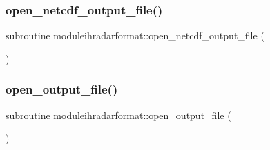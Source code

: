 \subsubsection{\texorpdfstring{open\+\_\+netcdf\+\_\+output\+\_\+file()}{open\_netcdf\_output\_file()}}
{\footnotesize\ttfamily subroutine moduleihradarformat\+::open\+\_\+netcdf\+\_\+output\+\_\+file (\begin{DoxyParamCaption}{ }\end{DoxyParamCaption})\hspace{0.3cm}{\ttfamily [private]}}

\mbox{\label{namespacemoduleihradarformat_a1fa82a4000e864d7a0c4a4e1759efac9}} 
\subsubsection{\texorpdfstring{open\+\_\+output\+\_\+file()}{open\_output\_file()}}
{\footnotesize\ttfamily subroutine moduleihradarformat\+::open\+\_\+output\+\_\+file (\begin{DoxyParamCaption}{ }\end{DoxyParamCaption})\hspace{0.3cm}{\ttfamily [private]}}

